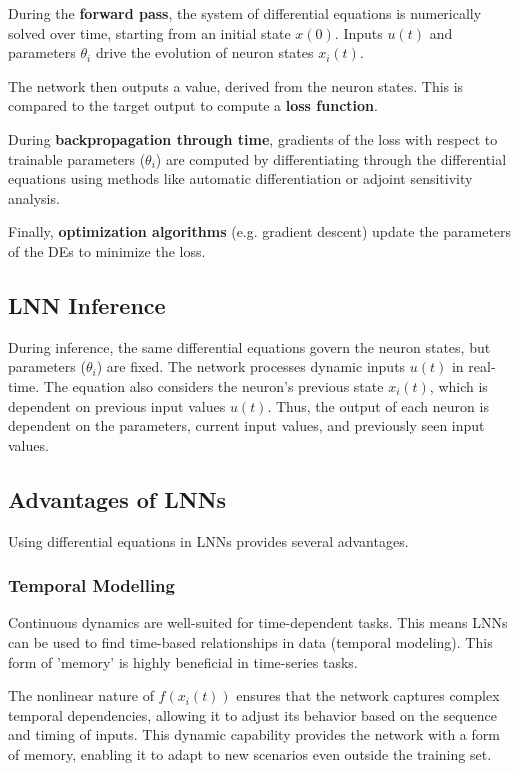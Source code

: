 During the \textbf{forward pass}, the system of differential equations is numerically solved over time, starting from an initial state \(x(0)\). Inputs \(u(t)\) and parameters \(\theta_i\) drive the evolution of neuron states \(x_i(t)\).

The network then outputs a value, derived from the neuron states. This is compared to the target output to compute a \textbf{loss function}.

During \textbf{backpropagation through time}, gradients of the loss with respect to trainable parameters (\(\theta_i\)) are computed by differentiating through the differential equations using methods like automatic differentiation or adjoint sensitivity analysis.

Finally, \textbf{optimization algorithms} (e.g. gradient descent) update the parameters of the DEs to minimize the loss.

\subsection*{LNN Inference}
During inference, the same differential equations govern the neuron states, but parameters (\(\theta_i\)) are fixed. The network processes dynamic inputs \(u(t)\) in real-time. The equation also considers the neuron's previous state \(x_i(t)\), which is dependent on previous input values \(u(t)\). Thus, the output of each neuron is dependent on the parameters, current input values, and previously seen input values.

\subsection*{Advantages of LNNs}
Using differential equations in LNNs provides several advantages.

\subsubsection*{Temporal Modelling}
Continuous dynamics are well-suited for time-dependent tasks. This means LNNs can be used to find time-based relationships in data (temporal modeling). This form of 'memory' is highly beneficial in time-series tasks.

The nonlinear nature of \(f(x_i(t))\) ensures that the network captures complex temporal dependencies, allowing it to adjust its behavior based on the sequence and timing of inputs. This dynamic capability provides the network with a form of memory, enabling it to adapt to new scenarios even outside the training set.


